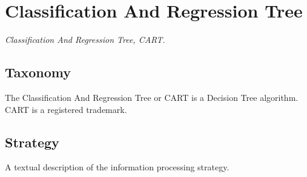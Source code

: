 
\section{Classification And Regression Tree}
\label{sec:cart}

\emph{Classification And Regression Tree, CART.}

\subsection{Taxonomy}
The Classification And Regression Tree or CART is a Decision Tree algorithm. CART is a registered trademark.

\subsection{Strategy}
A textual description of the information processing strategy.



